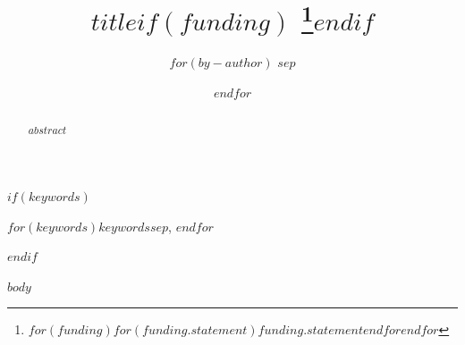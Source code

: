\documentclass[conference]{_extensions/ieeeconf/IEEEtran}
\begin{document}
\title{$title$$if(funding)$
\thanks{$for(funding)$$for(funding.statement)$$funding.statement$$endfor$$endfor$}$endif$}

\author{$for(by-author)$
$sep$
\and
$endfor$}

\maketitle

\begin{abstract}
$abstract$
\end{abstract}

$if(keywords)$
\begin{IEEEkeywords}
$for(keywords)$$keywords$$sep$, $endfor$
\end{IEEEkeywords}
$endif$

$body$
\end{document}

